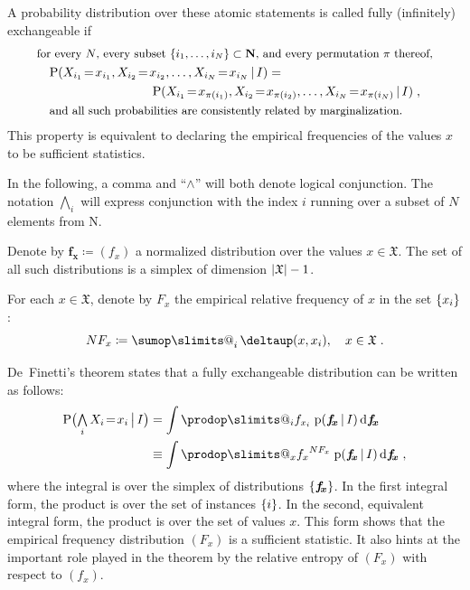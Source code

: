 \documentclass[\ifafour a4paper,12pt,\else a5paper,10pt,\fi%
onecolumn,oneside,article,%
british%
]{memoir}
\makeatletter
\theoremstyle{remark}
\theoremstyle{innote}
\def\sum{\DOTSI\sumop\slimits@}
\def\prod{\DOTSI\prodop\slimits@}
\newcommand*{\delt}{\deltaup}%
\newcommand*{\di}{\mathrm{d}}%
\newcommand*{\NN}{\bm{\mathrm{N}}}
\newcommand*{\defd}{\coloneqq}
\newcommand*{\Land}{\mathop{\textstyle\bigwedge}}
\DeclarePairedDelimiter\abs{\lvert}{\rvert}
\DeclarePairedDelimiter\set{\{}{\}}
\newcommand*{\pf}{\mathrm{p}}%
\newcommand*{\p}{\mathrm{P}}%
\renewcommand*{\|}[1][]{\nonscript\,#1\vert\nonscript\,\mathopen{}}
\newcommand*{\tsum}{\mathop{\textstyle\sum}\nolimits}
\renewcommand*{\=}{\TextOrMath\texteq\eq}
\newcommand*{\X}[1]{X_{#1}}
\newcommand*{\x}[1]{x_{#1}}
\newcommand*{\sx}{\mathfrak{X}}
\newcommand*{\fx}{\bm{f_{\!x}}}
\makeatother
\begin{document}
A probability distribution over these atomic statements
is called fully (infinitely) exchangeable if
\begin{multline}
  \label{eq:exchangeable}
  \text{\small for every $N$, every subset
    $\set{i_{1},\dotsc,i_{N}}\subset \NN$, and every permutation $\pi$ thereof,}
  \\
  \shoveleft{\p( \X{i_{1}}\=\x{i_{1}}, \X{i_{2}}\=\x{i_{2}},\dotsc,\X{i_{N}}\=\x{i_{N}}
    \| I) ={}}\\
  \shoveright{\p( \X{i_{1}}\=\x{\pi(i_{1})},
    \X{i_{2}}\=\x{\pi(i_{2})},\dotsc,\X{i_{N}}\=\x{\pi(i_{N})}   \| I) \;,}
  \\
  \shoveleft{\text{\small and all such probabilities are consistently related by marginalization.}}
\end{multline}
This property is equivalent to declaring the empirical frequencies of the
values $x$ to be sufficient statistics.

In the following, a comma and \enquote{$\land$} will both denote logical
conjunction. The notation $\Land_{i}$ will express conjunction with the
index $i$ running over a subset of $N$ elements from $\NN$.

Denote by $\fx \defd (f_{x})$ a normalized distribution over the values
$x \in \sx$. The set of all such distributions is a simplex of dimension
$\abs{\sx}-1$.

For each $x \in \sx$, denote by $F_{x}$ the empirical relative frequency of
$x$ in the set $\set{x_{i}}$:
\begin{equation}
  \label{eq:rel_frequencies}
  N F_{x} \defd \tsum_{i}\delt(x, \x{i}), \quad x \in \sx \;.
\end{equation}

De~Finetti's theorem states that a fully exchangeable distribution can be
written as follows:
\begin{equation}
  \label{eq:definetti_freq}
  \begin{split}
  \p\bigl( \Land_{i} \X{i}\=\x{i} \|[\big] I\bigr) &=
  \int \prod_{i} f_{\x{i}}\;  \pf(\fx \| I)\,\di\fx
\\&\equiv  \int\prod_{x} {f_{x}}^{N F_{x}}\;   \pf(\fx \| I)\,\di\fx \;,
\end{split}
\end{equation}
where the integral is over the simplex of distributions $\set{\fx}$. In the
first integral form, the product is over the set of instances $\set{i}$.
In the second, equivalent integral form, the product is over the set of
values $x$. This form shows that the empirical frequency distribution
$(F_{x})$ is a sufficient statistic. It also hints at the important role
played in the theorem by the relative entropy of $(F_{x})$ with respect to
$(f_{x})$.
\end{document}
